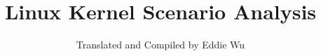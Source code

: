 \documentclass[12pt, a4paper, oneside]{book}
\begin{document}
\author{Translated and Compiled by Eddie Wu}
\title{Linux Kernel Scenario Analysis}
\maketitle


\setcounter{page}{1}
\tableofcontents
\listoffigures
\listoftables
{}







\begin{appendix}
\appendix

\end{appendix}



\thispagestyle{empty}

\end{document}
